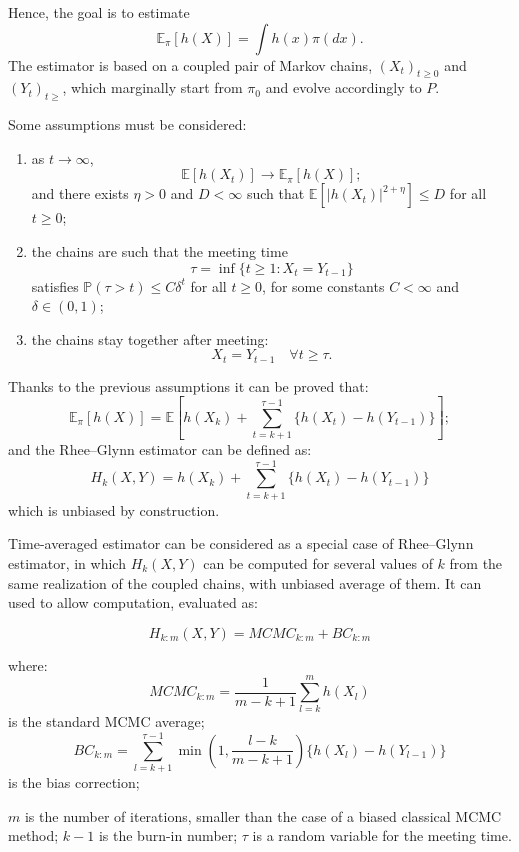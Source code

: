 \documentclass {article}
\begin{document}
Hence, the goal is to estimate
$$
\mathbb{E}_{\pi}[h(X)] 
= \int h(x) \pi (d x)
.
$$
The estimator is based on a coupled pair of Markov chains, $(X_t)_{t\geq 0}$ and $(Y_t)_{t\geq}$, which marginally start from $\pi_0$ and evolve accordingly to $P$.



Some assumptions must be considered:
\begin{enumerate}
	\item as $t \to \infty$, 
	$$ \mathbb E [h(X_t)] \to \mathbb E_\pi [h(X)];$$
	and there exists $\eta > 0$ and $D < \infty$ such that $\mathbb E [|h(X_t)|^{2 + \eta}] \leq D$ for all $t \geq 0$;
	
	
	\item the chains are such that the meeting time 
	$$
	\tau 
	= \inf\{t \geq 1 : X_t = Y_{t-1}\}
	$$ 
	satisfies $\mathbb{P}(\tau > t) \leq C \delta^t$ for all $t \geq 0$, for some constants $C < \infty$ and $\delta \in (0,1)$;
	
	
	\item the chains stay together after meeting:
	$$X_t = Y_{t-1} \quad  \forall t \geq \tau.$$
\end{enumerate}

Thanks to the previous assumptions it can be proved that:
$$\mathbb{E}_{\pi}[h(X)] = \mathbb{E}[
h(X_k) + \sum_{t = k+1}^{\tau -1}\{h(X_t) - h(Y_{t-1})\} ]
;$$
and  the Rhee--Glynn estimator can be defined as:
$$ 
H_k(X,Y)
= h(X_k) + \sum_{t = k+1}^{\tau -1}\{h(X_t) - h(Y_{t-1})\} 
$$
which is unbiased by construction.




Time-averaged estimator can be considered as a special case of Rhee--Glynn estimator, in which $H_k(X,Y)$ can be computed for several values of $k$ from the same realization of the coupled chains, with unbiased average of them. It can used to allow computation, evaluated as:

$$
H_{k:m}(X,Y) = MCMC_{k:m} + BC_{k:m}
$$

where:
$$MCMC_{k:m}=\frac{1}{m-k+1}\sum_{l=k}^{m}h(X_l)$$  is the standard MCMC average;
 \small{$$BC_{k:m}=\sum_{l=k+1}^{\tau -1}\min(1, \frac{l-k}{m-k+1})\{h(X_l)-h(Y_{l-1})\} $$} is the bias correction;
 
 $m$ is the number of iterations, smaller than the case of a biased classical MCMC method; $k-1$ is the burn-in number; $\tau$ is a random variable for the meeting time.
\end{document}
